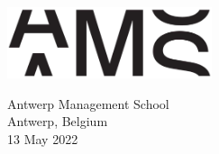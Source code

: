 \begin{titlepage}
\begin{center}
		\vspace{0.8cm}
	
			\includegraphics[width=6cm]{images/ams-logo}
		
		\vspace{0.8cm}
		
		\Large
		Antwerp Management School\\
		Antwerp, Belgium\\
		13 May 2022
	\end{center}
\end{titlepage}